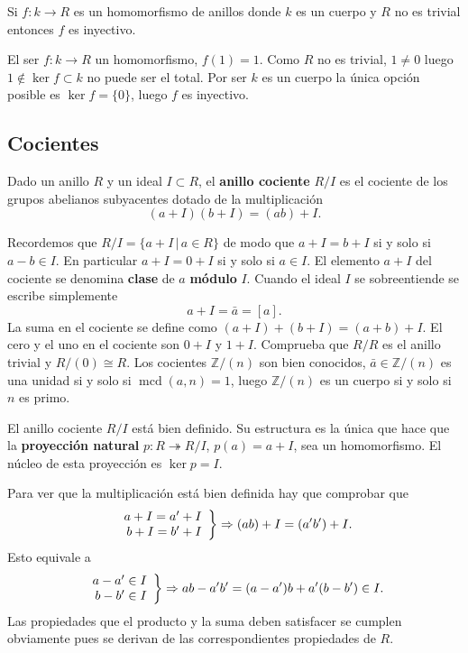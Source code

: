 
Si \(f\colon k\rightarrow R\) es un homomorfismo de anillos donde \(k\)
es un cuerpo y \(R\) no es trivial entonces \(f\) es inyectivo.


El ser \(f\colon k\rightarrow R\) un homomorfismo, \(f(1)=1\). Como
\(R\) no es trivial, \(1\neq 0\) luego \(1\notin\ker f\subset k\) no
puede ser el total. Por ser \(k\) es un cuerpo la única opción posible
es \(\ker f=\{0\}\), luego \(f\) es inyectivo.\\

\hypertarget{cocientes}{%
\subsection{Cocientes}\label{cocientes}}


Dado un anillo \(R\) y un ideal \(I\subset R\), el \textbf{anillo
cociente} \(R/I\) es el cociente de los grupos abelianos subyacentes
dotado de la multiplicación \[(a+I)(b+I)=(ab)+I.\] 


Recordemos que \(R/I=\{a+I\,|\, a\in R\}\) de modo que \(a+I=b+I\) si
y solo si \(a-b\in I\). En particular \(a+I=0+I\) si y solo si
\(a\in I\). El elemento \(a+I\) del cociente se denomina \textbf{clase}
de \(a\) \textbf{módulo} \(I\). Cuando el ideal \(I\) se sobreentiende
se escribe simplemente \[a+I=\bar a=[a].\] La suma en el cociente se
define como \((a+I)+(b+I)=(a+b)+I\). El cero y el uno en el cociente son
\(0+I\) y \(1+I\). Comprueba que \(R/R\) es el anillo trivial y
\(R/(0)\cong R\). Los cocientes \(\mathbb Z/(n)\) son bien conocidos,
\(\bar a\in\mathbb Z/(n)\) es una unidad si y solo si
\(\operatorname{mcd}(a,n)=1\), luego \(\mathbb Z/(n)\) es un cuerpo si y
solo si \(n\) es primo. 


El anillo cociente \(R/I\) está bien definido. Su estructura es la única
que hace que la \textbf{proyección natural}
\(p\colon R\twoheadrightarrow R/I\), \(p(a)=a+I\), sea un homomorfismo.
El núcleo de esta proyección es \(\ker p=I\). 


Para ver que la multiplicación está bien definida hay que comprobar que
\[\left.\begin{array}{r}a+I=a'+I\cr b+I=b'+I\end{array}\right\}\Rightarrow(ab)+I=(a'b')+I.\]
Esto equivale a
\[\left.\begin{array}{r}a-a'\in I\cr b-b'\in I\end{array}\right\}\Rightarrow ab-a'b'= (a-a')b+a'(b-b')\in I.\]
Las propiedades que el producto y la suma deben satisfacer se cumplen
obviamente pues se derivan de las correspondientes propiedades de \(R\).

